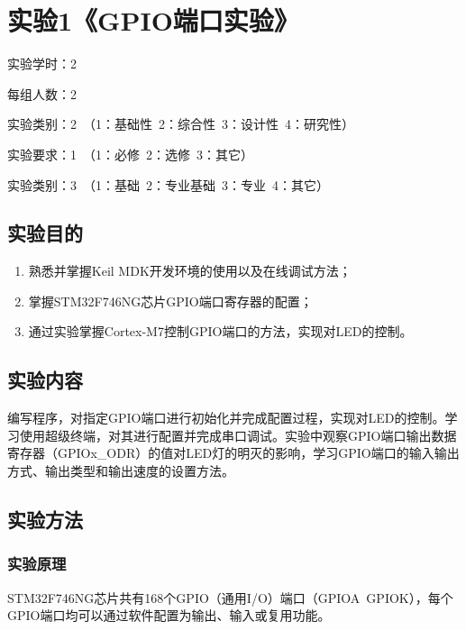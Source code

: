 ﻿\documentclass[UTF8,12pt]{article}
\newcommand\myemptypage{
    \null
    \thispagestyle{empty}
    \addtocounter{page}{-1}
    \newpage
}
\begin{document}
\begin{titlepage}
    
\end{titlepage}

\myemptypage

\begin{center}
    \tableofcontents
\end{center}

\newpage

\section{实验1《GPIO端口实验》}

实验学时：2

每组人数：2

实验类别：2\ （1：基础性\ 2：综合性\ 3：设计性\ 4：研究性）

实验要求：1\ （1：必修\ 2：选修\ 3：其它）

实验类别：3\ （1：基础\ 2：专业基础\ 3：专业\ 4：其它）

\subsection{实验目的}
\begin{enumerate}
    \item 熟悉并掌握Keil MDK开发环境的使用以及在线调试方法；
    \item 掌握STM32F746NG芯片GPIO端口寄存器的配置；
    \item 通过实验掌握Cortex-M7控制GPIO端口的方法，实现对LED的控制。
\end{enumerate}

\subsection{实验内容}
编写程序，对指定GPIO端口进行初始化并完成配置过程，实现对LED的控制。学习使用超级终端，对其进行配置并完成串口调试。实验中观察GPIO端口输出数据寄存器（GPIOx\_ODR）的值对LED灯的明灭的影响，学习GPIO端口的输入输出方式、输出类型和输出速度的设置方法。

\subsection{实验方法}

\subsubsection{实验原理}
STM32F746NG芯片共有168个GPIO（通用I/O）端口（GPIOA~GPIOK），每个GPIO端口均可以通过软件配置为输出、输入或复用功能。
\end{document}
